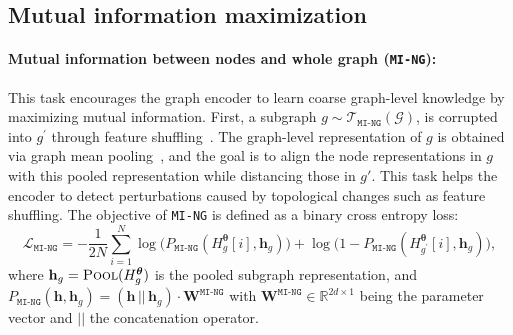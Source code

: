 \documentclass{article}
\newcommand{\ming}{\texttt{MI-NG}\xspace}
\begin{document}
\subsection{Mutual information maximization}

\paragraph*{Mutual information between nodes and whole graph (\ming):}
This task encourages the graph encoder to learn coarse graph-level knowledge by maximizing mutual information. First, a subgraph $g \sim \mathcal{T}_{\ming}(\mathcal{G})$, is corrupted into $g^\prime$ through feature shuffling~\citep{velivckovicdeep}. The graph-level representation of $g$ is obtained via graph mean pooling~\citep{xu2018powerful}, and the goal is to align the node representations in $g$ with this pooled representation while distancing those in $g'$. This task helps the encoder to detect perturbations caused by topological changes such as feature shuffling. The objective of \ming is defined as a binary cross entropy loss:
\begin{equation*}
\mathcal{L}_{\ming} = -\frac{1}{2N} \sum_{i=1}^{N} \log\big(P_{\ming}(H_{g}^{\boldsymbol{\theta}}[i],\mathbf{h}_g)\big) + \log\big(1- P_{\ming}(H_{g^\prime}^{\boldsymbol{\theta}}[i],\mathbf{h}_g)\big),
\end{equation*}
where $\mathbf{h}_g = \textsc{Pool}(H_{g}^{\boldsymbol{\theta}})$ is the pooled subgraph representation, and $P_{\ming}(\mathbf{h},\mathbf{h}_g) = (\mathbf{h} \, \vert\vert \, \mathbf{h}_g)\cdot \mathbf{W}^{\ming}$ with $\mathbf{W}^{\ming} \in \mathbb{R}^{2d \times 1}$ being the parameter vector and $\vert\vert$ the concatenation operator.
\end{document}
